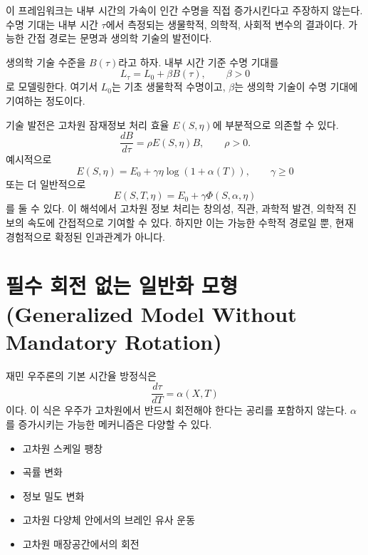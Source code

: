 \documentclass[11pt]{article}
\theoremstyle{remark}
\begin{document}
이 프레임워크는 내부 시간의 가속이 인간 수명을 직접 증가시킨다고 주장하지
않는다. 수명 기대는 내부 시간 $\tau$에서 측정되는 생물학적, 의학적,
사회적 변수의 결과이다. 가능한 간접 경로는 문명과 생의학 기술의 발전이다.

생의학 기술 수준을 $B(\tau)$라고 하자. 내부 시간 기준 수명 기대를
\begin{equation}
  L_\tau=L_0+\beta B(\tau),\qquad \beta>0
  \label{eq:life}
\end{equation}
로 모델링한다. 여기서 $L_0$는 기초 생물학적 수명이고, $\beta$는 생의학
기술이 수명 기대에 기여하는 정도이다.

기술 발전은 고차원 잠재정보 처리 효율 $E(S,\eta)$에 부분적으로 의존할 수 있다.
\begin{equation}
  \frac{dB}{d\tau}=\rho E(S,\eta)B,\qquad \rho>0.
  \label{eq:biomed}
\end{equation}
예시적으로
\begin{equation}
  E(S,\eta)=E_0+\gamma\eta\log(1+\alpha(T)),\qquad \gamma\ge 0
\end{equation}
또는 더 일반적으로
\begin{equation}
  E(S,T,\eta)=E_0+\gamma\Phi(S,\alpha,\eta)
\end{equation}
를 둘 수 있다. 이 해석에서 고차원 정보 처리는 창의성, 직관, 과학적 발견,
의학적 진보의 속도에 간접적으로 기여할 수 있다. 하지만 이는 가능한 수학적
경로일 뿐, 현재 경험적으로 확정된 인과관계가 아니다.

\section{필수 회전 없는 일반화 모형 (Generalized Model Without Mandatory Rotation)}

재민 우주론의 기본 시간율 방정식은
\begin{equation}
  \frac{d\tau}{dT}=\alpha(X,T)
\end{equation}
이다. 이 식은 우주가 고차원에서 반드시 회전해야 한다는 공리를 포함하지
않는다. $\alpha$를 증가시키는 가능한 메커니즘은 다양할 수 있다.

\begin{itemize}[leftmargin=2em]
  \item 고차원 스케일 팽창
  \item 곡률 변화
  \item 정보 밀도 변화
  \item 고차원 다양체 안에서의 브레인 유사 운동
  \item 고차원 매장공간에서의 회전
\end{itemize}
\end{document}
